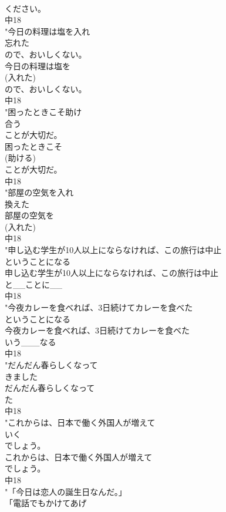 \documentclass[8pt]{extreport}
\begin{document}
\begin{CJK}{UTF8}{min}
\\	ください。
\\	中18
\\	"今日の料理は塩を入れ
\\	忘れた
\\	ので、おいしくない。
\\	今日の料理は塩を
\\	(入れた)
\\	ので、おいしくない。
\\	中18
\\	"困ったときこそ助け
\\	合う
\\	ことが大切だ。
\\	困ったときこそ
\\	(助ける)
\\	ことが大切だ。
\\	中18
\\	"部屋の空気を入れ
\\	換えた
\\	部屋の空気を
\\	(入れた)
\\	中18
\\	"申し込む学生が10人以上にならなければ、この旅行は中止
\\	ということになる
\\	申し込む学生が10人以上にならなければ、この旅行は中止
\\	と__ことに__
\\	中18
\\	"今夜カレーを食べれば、3日続けてカレーを食べた
\\	ということになる
\\	今夜カレーを食べれば、3日続けてカレーを食べた
\\	いう___なる
\\	中18
\\	"だんだん春らしくなって
\\	きました
\\	だんだん春らしくなって
\\	た
\\	中18
\\	"これからは、日本で働く外国人が増えて
\\	いく
\\	でしょう。
\\	これからは、日本で働く外国人が増えて
\\	でしょう。
\\	中18
\\	"「今日は恋人の誕生日なんだ。」
\\	「電話でもかけてあげ

\end{CJK}
\end{document}
